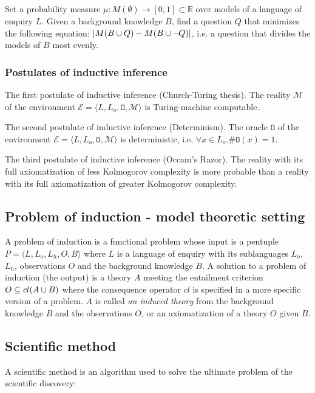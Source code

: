 Set a probability measure $\mu:M(\emptyset) \to [0,1] \subset \mathbb{R}$ over models of a language of enquiry $L$. Given a background knowledge $B$, find a question $Q$ that minimizes the following equation: $|M(B \cup {Q})-M(B \cup {\neg Q})|$, i.e. a question that divides the models of $B$ most evenly.

\subsubsection{Postulates of inductive inference}
\begin{defn}
The first postulate of inductive inference (Church-Turing thesis). The reality
$\mathcal{M}$ of the environment
$\mathcal{E}=\langle L, L_o, \mathtt{O}, \mathcal{M} \rangle$
is Turing-machine computable.
\end{defn}

\begin{defn}
The second postulate of inductive inference (Determinism). The oracle $\mathtt{O}$ of the environment $\mathcal{E}=\langle L, L_o, \mathtt{O}, \mathcal{M} \rangle$
is deterministic, i.e. $\forall x \in L_o. \#\mathtt{O}(x)=1$.
\end{defn}

\begin{defn}
The third postulate of inductive inference (Occam's Razor). The reality with its full axiomatization of less Kolmogorov complexity is more probable than a reality with its full axiomatization of greater Kolmogorov complexity.
\end{defn}

\subsection{Problem of induction - model theoretic setting}
A problem of induction is a functional problem whose input is a pentuple $P=\langle L, L_o, L_h, O, B\rangle$ where $L$ is a language of enquiry with its sublanguages $L_o$, $L_h$, observations $O$ and the background knowledge $B$. A solution to a problem of induction (the output) is a theory $A$ meeting the entailment criterion
$O \subseteq cl(A \cup B )$ where the consequence operator $cl$ is specified  in a more specific version of a problem.
$A$ is called \emph{an induced theory} from the background knowledge $B$ and the observations $O$, or an axiomatization of a theory $O$ given $B$.

\subsection{Scientific method}
\label{scientific_method}
A scientific method is an algorithm used to solve the ultimate problem of the scientific discovery:

